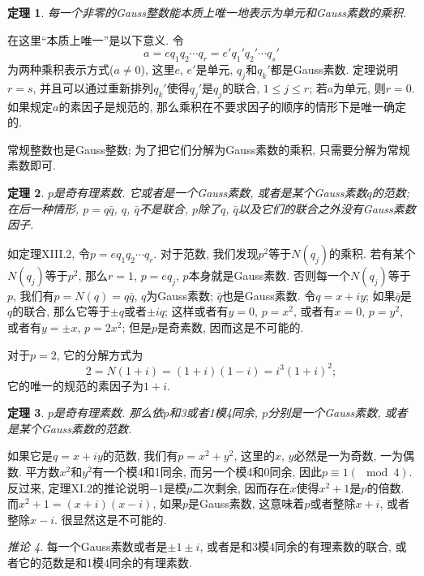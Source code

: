 \documentclass[12pt,a4paper]{book} %
\newtheorem{theorem}{定理}
\theoremstyle{remark}
\theoremstyle{example}
\theoremstyle{lemma}
\theoremstyle{corollary}
\newtheorem{corollary}[theorem]{推论}
\numberwithin{theorem}{chapter}
\begin{document}
\begin{theorem}
每一个非零的Gauss整数能本质上唯一地表示为单元和Gauss素数的乘积.
\end{theorem}

在这里``本质上唯一''是以下意义. 令
\[
a = eq_1q_2 \cdots q_r = e' q_1' q_2' \cdots q_s'
\]
为两种乘积表示方式($a \neq 0$), 这里$e$, $e'$是单元, $q_j$和$q_k'$都是Gauss素数. 定理说明$r = s$, 并且可以通过重新排列$q_k'$使得$q_j'$是$q_j$的联合, $1 \le j \le r$; 若$a$为单元, 则$r = 0$. 如果规定$a$的素因子是规范的, 那么乘积在不要求因子的顺序的情形下是唯一确定的.

常规整数也是Gauss整数; 为了把它们分解为Gauss素数的乘积, 只需要分解为常规素数即可.

\begin{theorem}
$p$是奇有理素数. 它或者是一个Gauss素数, 或者是某个Gauss素数$q$的范数; 在后一种情形, $p = q \bar{q}$, $q$, $\bar{q}$不是联合, $p$除了$q$, $\bar{q}$以及它们的联合之外没有Gauss素数因子.
\end{theorem}

如定理XIII.2, 令$p = eq_1q_2 \cdots q_r$. 对于范数, 我们发现$p^2$等于$N(q_j)$的乘积. 若有某个$N(q_j)$等于$p^2$, 那么$r = 1$, $p = eq_j$, $p$本身就是Gauss素数. 否则每一个$N(q_j)$等于$p$, 我们有$p = N(q) = q\bar{q}$, $q$为Gauss素数; $\bar{q}$也是Gauss素数.  令$q = x + iy$; 如果$\bar{q}$是$q$的联合, 那么它等于$\pm q$或者$\pm iq$; 这样或者有$y = 0$, $p = x^2$, 或者有$x = 0$, $p = y^2$, 或者有$y = \pm x$, $p = 2x^2$; 但是$p$是奇素数, 因而这是不可能的.

对于$p = 2$, 它的分解方式为
\[
2 = N(1 + i) = (1 + i)(1 - i) = i^3(1 + i)^2;
\]
它的唯一的规范的素因子为$1 + i$.

\begin{theorem}
$p$是奇有理素数. 那么依$p$和3或者1模4同余, $p$分别是一个Gauss素数, 或者是某个Gauss素数的范数.
\end{theorem}

如果它是$q = x + iy$的范数, 我们有$p = x^2 + y^2$, 这里的$x$, $y$必然是一为奇数, 一为偶数. 平方数$x^2$和$y^2$有一个模4和1同余, 而另一个模4和0同余, 因此$p \equiv 1 (\mod 4)$. 反过来, 定理XI.2的推论说明$-1$是模$p$二次剩余, 因而存在$x$使得$x^2 + 1$是$p$的倍数. 而$x^2 + 1 = (x + i)(x - i)$, 如果$p$是Gauss素数, 这意味着$p$或者整除$x + i$, 或者整除$x - i$. 很显然这是不可能的.

\begin{corollary}
每一个Gauss素数或者是$\pm 1 \pm i$, 或者是和3模4同余的有理素数的联合, 或者它的范数是和1模4同余的有理素数.
\end{corollary}
\end{document}
